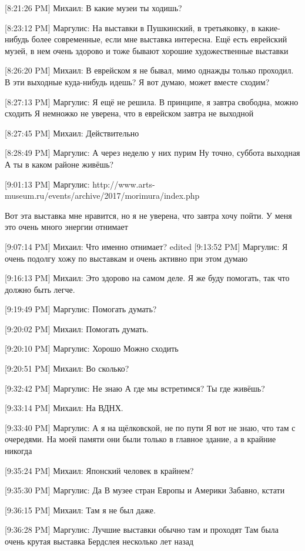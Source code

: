 \documentclass{article}
\begin{document}
[8:21:26 PM] Михаил:
В какие музеи ты ходишь?

[8:23:12 PM] Маргулис:
На выставки в Пушкинский, в третьяковку, в какие-нибудь более современные, если мне выставка интересна. Ещё есть еврейский музей, в нем очень здорово и тоже бывают хорошие художественные выставки

[8:26:20 PM] Михаил:
В еврейском я не бывал, мимо однажды только проходил. В эти выходные куда-нибудь идешь? Я вот думаю, может вместе сходим?

[8:27:13 PM] Маргулис:
Я ещё не решила. В принципе, я завтра свободна, можно сходить
 Я немножко не уверена, что в еврейском завтра не выходной

[8:27:45 PM] Михаил:
Действительно

[8:28:49 PM] Маргулис:
А через неделю у них пурим
 Ну точно, суббота выходная
 А ты в каком районе живёшь?

[9:01:13 PM] Маргулис:
http://www.arts-museum.ru/events/archive/2017/morimura/index.php

Вот эта выставка мне нравится, но я не уверена, что завтра хочу пойти. У меня это очень много энергии отнимает

[9:07:14 PM] Михаил:
Что именно отнимает?
edited 
[9:13:52 PM] Маргулис:
Я очень подолгу хожу по выставкам и очень активно при этом думаю

[9:16:13 PM] Михаил:
Это здорово на самом деле.
 Я же буду помогать, так что должно быть легче.

[9:19:49 PM] Маргулис:
Помогать думать?

[9:20:02 PM] Михаил:
Помогать думать.

[9:20:10 PM] Маргулис:
Хорошо
 Можно сходить

[9:20:51 PM] Михаил:
Во сколько?

[9:32:42 PM] Маргулис:
Не знаю
 А где мы встретимся? Ты где живёшь?

[9:33:14 PM] Михаил:
На ВДНХ.

[9:33:40 PM] Маргулис:
А я на щёлковской, не по пути
 Я вот не знаю, что там с очередями. На моей памяти они были только в главное здание, а в крайние никогда

[9:35:24 PM] Михаил:
Японский человек в крайнем?

[9:35:30 PM] Маргулис:
Да
 В музее стран Европы и Америки
 Забавно, кстати

[9:36:15 PM] Михаил:
Там я не был даже.

[9:36:28 PM] Маргулис:
Лучшие выставки обычно там и проходят
 Там была очень крутая выставка Бердслея несколько лет назад
\end{document}
